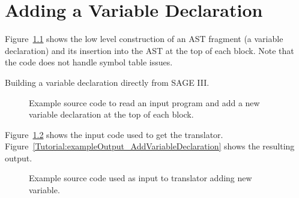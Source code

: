 \chapter{Adding a Variable Declaration}

   Figure~\ref{Tutorial:exampleAddVariableDeclaration} shows the low level
construction of an AST fragment (a variable declaration) and its insertion 
into the AST at the top of each block.  Note that the code does not handle 
symbol table issues.

   Building a variable declaration directly from SAGE III.



\begin{figure}[!h]
{\indent
{\mySmallFontSize


\begin{latexonly}
   
\end{latexonly}

\begin{htmlonly}
   
\end{htmlonly}

}
}
\caption{Example source code to read an input program and add a new variable 
         declaration at the top of each block.}
\label{Tutorial:exampleAddVariableDeclaration}
\end{figure}


   Figure~\ref{Tutorial:exampleInputCode_AddVariableDeclaration} shows the
input code used to get the translator.
Figure~\ref{Tutorial:exampleOutput_AddVariableDeclaration} shows the resulting output.

\begin{figure}[!h]
{\indent
{\mySmallFontSize


\begin{latexonly}
   
\end{latexonly}

\begin{htmlonly}
   
\end{htmlonly}

}
}
\caption{Example source code used as input to translator adding new variable.}
\label{Tutorial:exampleInputCode_AddVariableDeclaration}
\end{figure}


